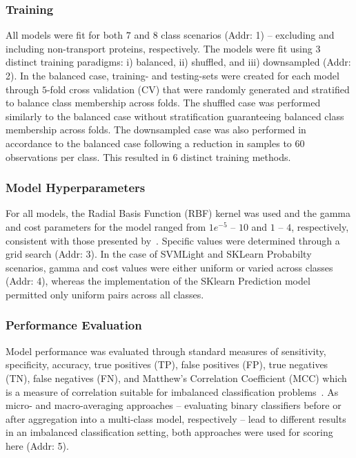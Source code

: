 \subsubsection{Training}
All models were fit for both $7$ and $8$ class scenarios (Addr: 1) -- excluding and including non-transport proteins,
respectively. The models were fit using $3$ distinct training paradigms: i) balanced, ii) shuffled, and iii)
downsampled (Addr: 2). In the balanced case, training- and testing-sets were created for each model through $5$-fold
cross validation (CV) that were randomly generated and stratified to balance class membership across folds. The
shuffled case was performed similarly to the balanced case without stratification guaranteeing balanced class membership
across folds. The downsampled case was also performed in accordance to the balanced case following a reduction in
samples to $60$ observations per class. This resulted in $6$ distinct training methods.

\subsubsection{Model Hyperparameters}
For all models, the Radial Basis Function (RBF) kernel was used and the gamma and cost parameters for the model ranged
from $1e^{-5}$ -- $10$ and $1$ -- $4$, respectively, consistent with those presented by~\cite{mishra2014prediction}.
Specific values were determined through a grid search (Addr: 3). In the case of SVMLight and SKLearn Probabilty
scenarios, gamma and cost values were either uniform or varied across classes (Addr: 4), whereas the implementation of
the SKlearn Prediction model permitted only uniform pairs across all classes.

\subsubsection{Performance Evaluation}
Model performance was evaluated through standard measures of sensitivity, specificity, accuracy, true positives (TP),
false positives (FP), true negatives (TN), false negatives (FN), and Matthew's Correlation Coefficient (MCC) which is a
measure of correlation suitable for imbalanced classification problems~\cite{mcc2017optimal}. As micro- and
macro-averaging approaches -- evaluating binary classifiers before or after aggregation into a multi-class model,
respectively -- lead to different results in an imbalanced classification setting, both approaches were used for
scoring here (Addr: 5).

